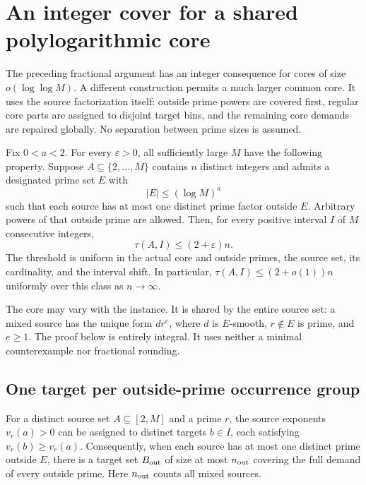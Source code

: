 \section{An integer cover for a shared polylogarithmic core}
\label{sc:section}

The preceding fractional argument has an integer consequence for cores
of size \(o(\log\log M)\). A different construction permits a much
larger common core. It uses the source factorization itself: outside
prime powers are covered first, regular core parts are assigned to
disjoint target bins, and the remaining core demands are repaired
globally. No separation between prime sizes is assumed.

\begin{theorem}
\label{thm:sc-polylog}
Fix \(0<a<2\). For every \(\varepsilon>0\), all sufficiently large
\(M\) have the following property. Suppose
\(A\subseteq\{2,\ldots,M\}\) contains \(n\) distinct integers and
admits a designated prime set \(E\) with
\[
 |E|\le(\log M)^a
\]
such that each source has at most one distinct prime factor outside
\(E\). Arbitrary powers of that outside prime are allowed.
Then, for every positive interval \(I\) of \(M\) consecutive
integers,
\begin{equation}
 \tau(A,I)\le(2+\varepsilon)n.
 \label{sc:main-bound}
\end{equation}
The threshold is uniform in the actual core and outside primes, the
source set, its cardinality, and the interval shift. In particular,
\(\tau(A,I)\le(2+o(1))n\) uniformly over this class as \(n\to\infty\).
\end{theorem}

The core may vary with the instance. It is shared by the entire
source set: a mixed source has the unique form \(d r^e\), where
\(d\) is \(E\)-smooth, \(r\notin E\) is prime, and \(e\ge1\).
The proof below is entirely integral. It uses neither a minimal
counterexample nor fractional rounding.

\subsection{One target per outside-prime occurrence group}

\begin{lemma}
\label{sc:outside-matching}
For a distinct source set \(A\subseteq[2,M]\) and a prime \(r\),
the source exponents \(v_r(a)>0\) can be assigned to distinct
targets \(b\in I\), each satisfying \(v_r(b)\ge v_r(a)\).
Consequently, when each source has at most one distinct prime
outside \(E\), there is a target set \(B_{\rm out}\) of size at
most \(n_{\rm out}\) covering the full demand of every outside
prime. Here \(n_{\rm out}\) counts all mixed sources.
\end{lemma}

